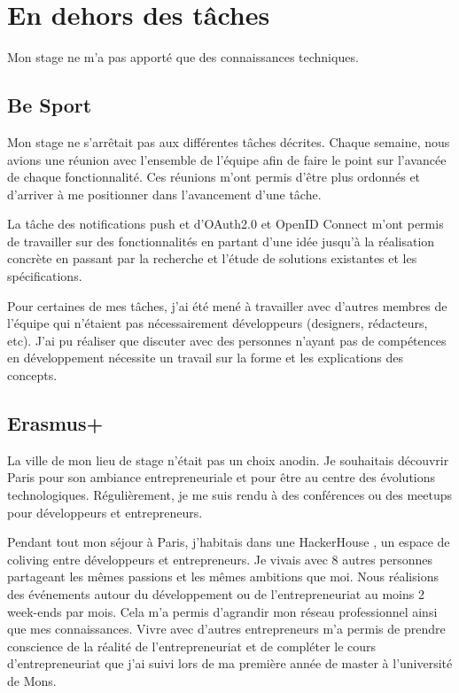 \section{En dehors des tâches}

Mon stage ne m'a pas apporté que des connaissances techniques.

\subsection*{Be Sport}

Mon stage ne s'arrêtait pas aux différentes tâches décrites. Chaque semaine,
nous avions une réunion avec l'ensemble de l'équipe afin de faire le point sur
l'avancée de chaque fonctionnalité. Ces réunions m'ont permis d'être plus
ordonnés et d'arriver à me positionner dans l'avancement d'une tâche.

La tâche des notifications push et d'OAuth2.0 et OpenID Connect m'ont permis de
travailler sur des fonctionnalités en partant d'une idée jusqu'à la réalisation
concrète en passant par la recherche et l'étude de solutions existantes et les
spécifications.

Pour certaines de mes tâches, j'ai été mené à travailler avec d'autres membres
de l'équipe qui n'étaient pas nécessairement développeurs (designers,
rédacteurs, etc). J'ai pu réaliser que discuter avec des personnes n'ayant pas
de compétences en développement nécessite un travail sur la forme et les
explications des concepts.

\subsection*{Erasmus+}

La ville de mon lieu de stage n'était pas un choix anodin. Je souhaitais découvrir
Paris pour son ambiance entrepreneuriale et pour être au centre des évolutions
technologiques.
Régulièrement, je me suis rendu à des conférences ou des meetups pour
développeurs et entrepreneurs.

Pendant tout mon séjour à Paris, j'habitais dans une HackerHouse \cite{hackerhouse-website}, un espace de
coliving entre développeurs et entrepreneurs. Je vivais avec 8 autres personnes
partageant les mêmes passions et les mêmes ambitions que moi. Nous réalisions des événements autour du
développement ou de l'entrepreneuriat au moins 2 week-ends par mois. Cela m'a
permis d'agrandir mon réseau professionnel ainsi que mes connaissances.
Vivre avec d'autres entrepreneurs m'a permis de prendre conscience de la réalité
de l'entrepreneuriat et de compléter le cours d'entrepreneuriat que j'ai suivi
lors de ma première année de master à l'université de Mons.